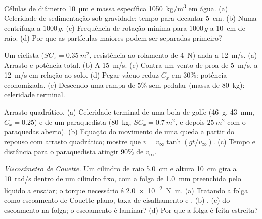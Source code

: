 \begin{exercise}[$\star\star$]\label{exo:b2:viscous-flows:6}
Células de diâmetro \qty{10}{\micro m} e massa específica \qty{1050}{kg/m^3} em água.
(a) Celeridade de sedimentação sob gravidade; tempo para decantar \qty{5}{cm}. (b) Numa
centrífuga a $1000\,g$. (c) Frequência de rotação mínima para $1000\,g$ a
\qty{10}{cm} de raio. (d) Por que as partículas maiores podem ser separadas primeiro?
\end{exercise}

\begin{exercise}[$\star\star$]\label{exo:b2:viscous-flows:7}
Um ciclista ($SC_x = \qty{0.35}{m^2}$, resistência ao rolamento de \qty{4}{N}) anda a
\qty{12}{m/s}. (a) Arrasto e potência total. (b) A \qty{15}{m/s}. (c) Contra um
vento de proa de \qty{5}{m/s}, a \qty{12}{m/s} em relação ao solo. (d) Pegar vácuo reduz
$C_x$ em $30\%$: potência economizada. (e) Descendo uma rampa de $5\%$ sem pedalar
(massa de \qty{80}{kg}): celeridade terminal.
\end{exercise}

\begin{exercise}[$\star\star$]\label{exo:b2:viscous-flows:8}
Arrasto quadrático. (a) Celeridade terminal de uma bola de golfe (\qty{46}{g}, \qty{43}{mm},
$C_x = 0.25$) e de um paraquedista (\qty{80}{kg}, $SC_x = \qty{0.7}{m^2}$, e depois
$\qty{25}{m^2}$ com o paraquedas aberto). (b) Equação do movimento de uma queda
a partir do repouso com arrasto quadrático; mostre que $v = v_\infty\tanh(gt/v_\infty)$. (c)
Tempo e distância para o paraquedista atingir $90\%$ de $v_\infty$.
\end{exercise}

\begin{exercise}[$\star\star$]\label{exo:b2:viscous-flows:9}
\emph{Viscosímetro de Couette.} Um cilindro de raio \qty{5.0}{cm} e altura
\qty{10}{cm} gira a \qty{10}{rad/s} dentro de um cilindro fixo, com a folga de
\qty{1.0}{mm} preenchida pelo líquido a ensaiar; o torque necessário é
\qty{2.0e-2}{N.m}. (a) Tratando a folga como escoamento de Couette plano, taxa de cisalhamento
e . (b) . (c)  do escoamento na folga;
o escoamento é laminar? (d) Por que a folga é feita estreita?
\end{exercise}

